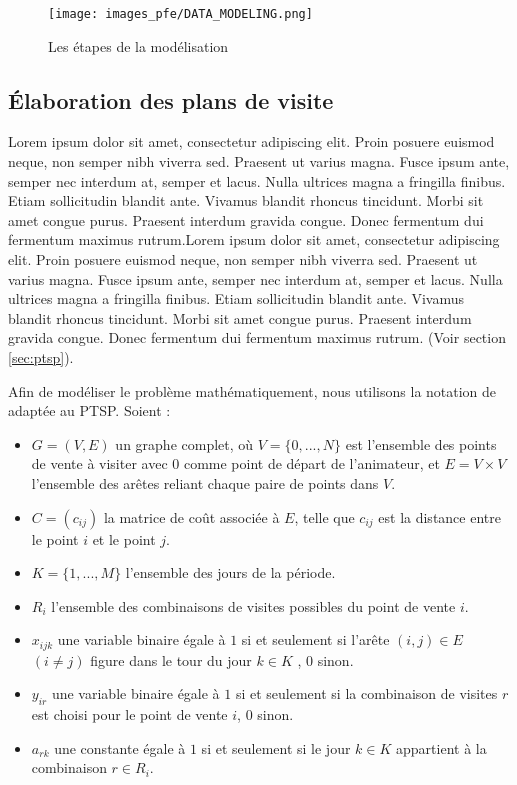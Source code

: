 \begin{figure}[hbt!]
  \centering
  \texttt{[image: images\_pfe/DATA\_MODELING.png]}
  \caption{Les étapes de la modélisation}
  \label{fig:data-modeling}
\end{figure}
\FloatBarrier

\subsection{Élaboration des plans de visite}
Lorem ipsum dolor sit amet, consectetur adipiscing elit. Proin posuere euismod neque, non semper nibh viverra sed. Praesent ut varius magna. Fusce ipsum ante, semper nec interdum at, semper et lacus. Nulla ultrices magna a fringilla finibus. Etiam sollicitudin blandit ante. Vivamus blandit rhoncus tincidunt. Morbi sit amet congue purus. Praesent interdum gravida congue. Donec fermentum dui fermentum maximus rutrum.Lorem ipsum dolor sit amet, consectetur adipiscing elit. Proin posuere euismod neque, non semper nibh viverra sed. Praesent ut varius magna. Fusce ipsum ante, semper nec interdum at, semper et lacus. Nulla ultrices magna a fringilla finibus. Etiam sollicitudin blandit ante. Vivamus blandit rhoncus tincidunt. Morbi sit amet congue purus. Praesent interdum gravida congue. Donec fermentum dui fermentum maximus rutrum. (Voir section \ref{sec:ptsp}).

\medskip
Afin de modéliser le problème mathématiquement, nous utilisons la notation de \parencite{cordeau_tabu_1997} adaptée au PTSP. Soient :

\begin{itemize}
  \item $G = (V, E)$ un graphe complet, où $V = \{0,...,N\}$ est l'ensemble des points de vente à visiter avec $0$ comme point de départ de l'animateur, et $E = V × V$ l'ensemble des arêtes reliant chaque paire de points dans $V$.
  \item $C = (c_{ij})$ la matrice de coût associée à $E$, telle que $c_{ij}$ est la distance entre le point $i$ et le point $j$.
  \item $K = \{1,...,M\}$ l'ensemble des jours de la période.
  \item $R_i$ l'ensemble des combinaisons de visites possibles du point de vente $i$.
  \item $x_{ijk}$ une variable binaire égale à $1$ si et seulement si l'arête $(i,j) \in E$ $(i \ne j)$ figure dans le tour du jour $k \in K$ , 0 sinon.
  \item $y_{ir}$ une variable binaire égale à $1$ si et seulement si la combinaison de visites $r$ est choisi pour le point de vente $i$, 0 sinon.
  \item $a_{rk}$ une constante égale à $1$ si et seulement si le jour $k \in K$ appartient à la combinaison $r \in R_i$.
\end{itemize}

